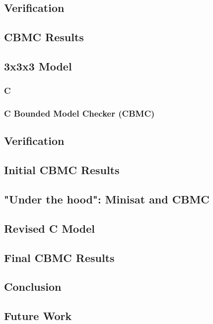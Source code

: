 \documentclass{article}
\begin{document}
\subsection {Verification}

\subsection {CBMC Results}

\subsection {3x3x3 Model}

\subsubsection {C}

\subsubsection {C Bounded Model Checker (CBMC)}

\subsection {Verification}

\subsection {Initial CBMC Results}

\subsection {"Under the hood": Minisat and CBMC}

\subsection {Revised C Model}

\subsection {Final CBMC Results}

\subsection {Conclusion}

\subsection {Future Work}
\end{document}
